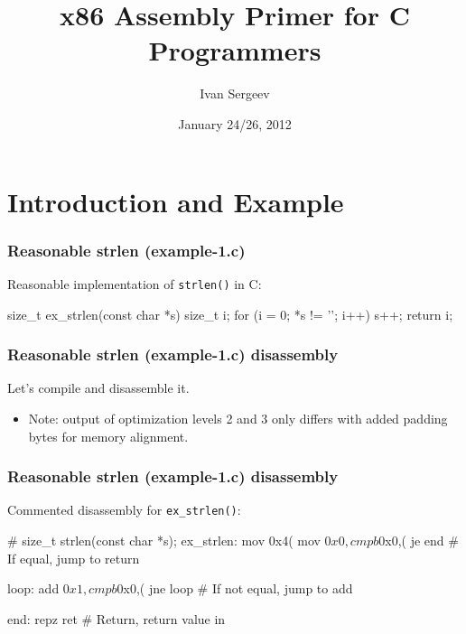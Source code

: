 \documentclass[11pt,xcolor=dvipsnames]{beamer}
\newcommand{\vs}{\vspace{0.5em}}
\begin{document}
\title{x86 Assembly Primer for C Programmers}
\author{Ivan Sergeev}
\date{January 24/26, 2012}

\begin{frame}[plain]
  \titlepage
\end{frame}

\section*{Introduction and Example}

\begin{frame}[fragile,t]
\frametitle{Reasonable strlen (example-1.c)}
Reasonable implementation of \verb+strlen()+ in C:\vs
\begin{ccode}
size_t ex_strlen(const char *s) {
    size_t i;
    for (i = 0; *s != '\0'; i++)
        s++;
    return i;
}
\end{ccode}
\end{frame}

\begin{frame}[fragile,t]
\frametitle{Reasonable strlen (example-1.c) disassembly}
Let's compile and disassemble it.\vs
{}
\begin{itemize}
	\item Note: output of optimization levels 2 and 3 only differs with added padding bytes for memory alignment.
\end{itemize}
\end{frame}

\begin{frame}[fragile,t]
\frametitle{Reasonable strlen (example-1.c) disassembly}
Commented disassembly for \verb+ex_strlen()+:\vs
\begin{gascode}
# size_t strlen(const char *s);
ex_strlen:
  mov    0x4(%
  mov    $0x0,%
  cmpb   $0x0,(%
  je     end                  #    If equal, jump to return

  loop:
    add    $0x1,%
    cmpb   $0x0,(%
    jne    loop               #    If not equal, jump to add

  end:
    repz ret                  # Return, return value in %
\end{gascode}
\end{frame}
\end{document}
